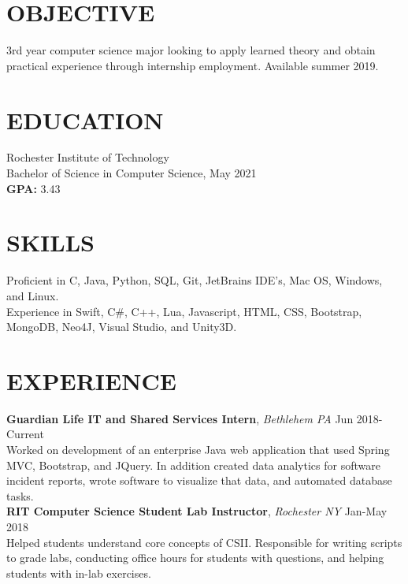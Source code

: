 \documentclass[line, margin]{res}
\begin{document}
\address{(484) 554-8487\\ emp9173@rit.edu}

\begin{resume}

\section{OBJECTIVE}
3rd year computer science major looking to apply learned theory and obtain practical experience through internship employment. Available summer 2019.

\section{EDUCATION} 
 Rochester Institute of Technology \\
 Bachelor of Science in Computer Science, May 2021\\
 \textbf{GPA:} 3.43
 
\section{SKILLS}
Proficient in C, Java, Python, SQL, Git, JetBrains IDE’s, Mac OS, Windows, and Linux. \\
Experience in Swift, C\#, C++, Lua, Javascript, HTML, CSS, Bootstrap, MongoDB, Neo4J, Visual Studio, and Unity3D.
 
\section{EXPERIENCE} 
\textbf{Guardian Life IT and Shared Services Intern}, \textit{Bethlehem PA} \hfill Jun 2018-Current \\
Worked on development of an enterprise Java web application that used Spring MVC, Bootstrap, and JQuery.  In addition created
data analytics for software incident reports, wrote software to visualize that data, and automated database tasks.\\ [10pt]
\textbf{RIT Computer Science Student Lab Instructor}, \textit{Rochester NY} \hfill Jan-May 2018 \\
Helped students understand core concepts of CSII. Responsible for writing scripts
to grade labs, conducting office hours for students with questions, and helping students
with in-lab exercises.


\end{resume}
\end{document}
